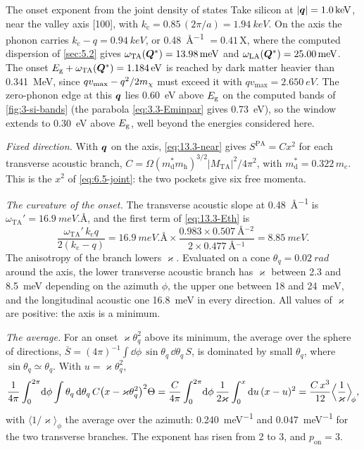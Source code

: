 \begin{workedexample}{The onset exponent from the joint density of states}\label{we:13-onset-exp}
Take silicon at $|\bm{q}| = \SI{1.0}{keV}$, near the valley axis [100], with $k_{\mathrm{c}} = 0.85\,(2\pi/a) = \SI{1.94}{keV}$. On the axis the phonon carries $k_{\mathrm{c}} - q = \SI{0.94}{keV}$, or \SI{0.48}{\angstrom^{-1}} $= 0.41\,\mathrm{X}$, where the computed dispersion of \cref{sec:5.2} gives $\omega_{\mathrm{TA}}(\bm{Q}^*) = \SI{13.98}{meV}$ and $\omega_{\mathrm{LA}}(\bm{Q}^*) = \SI{25.00}{meV}$. The onset $E_{\mathrm{g}} + \omega_{\mathrm{TA}}(\bm{Q}^*) = \SI{1.184}{eV}$ is reached by dark matter heavier than \SI{0.341}{MeV}, since $qv_{\mathrm{max}} - q^2/2m_{\chi}$ must exceed it with $qv_{\mathrm{max}} = \SI{2.650}{eV}$. The zero-phonon edge at this $\bm{q}$ lies \SI{0.60}{eV} above $E_{\mathrm{g}}$ on the computed bands of \cref{fig:3-si-bands} (the parabola \cref{eq:3.3-Eminpar} gives \SI{0.73}{eV}), so the window extends to \SI{0.30}{eV} above $E_{\mathrm{g}}$, well beyond the energies considered here.

\emph{Fixed direction.} With $\bm{q}$ on the axis, \cref{eq:13.3-near} gives $S^{\mathrm{PA}} = Cx^2$ for each transverse acoustic branch, $C = \Omega(m^*_{\mathrm{d}}m_{\mathrm{h}})^{3/2}|M_{\mathrm{TA}}|^2/4\pi^2$, with $m^*_{\mathrm{d}} = 0.322\,m_e$. This is the $x^2$ of \cref{eq:6.5-joint}: the two pockets give six free momenta.

\emph{The curvature of the onset.} The transverse acoustic slope at \SI{0.48}{\angstrom^{-1}} is $\omega_{\mathrm{TA}}' = \SI{16.9}{meV.\angstrom}$, and the first term of \cref{eq:13.3-Eth} is
\begin{equation*}
  \frac{\omega_{\mathrm{TA}}'\,k_{\mathrm{c}}q}{2(k_{\mathrm{c}} - q)} = \SI{16.9}{meV.\angstrom}\times\frac{0.983\times\SI{0.507}{\angstrom^{-2}}}{2\times\SI{0.477}{\angstrom^{-1}}} = \SI{8.85}{meV} .
\end{equation*}
The anisotropy of the branch lowers $\varkappa$. Evaluated on a cone $\theta_q = \SI{0.02}{rad}$ around the axis, the lower transverse acoustic branch has $\varkappa$ between 2.3 and \SI{8.5}{meV} depending on the azimuth $\phi$, the upper one between 18 and \SI{24}{meV}, and the longitudinal acoustic one \SI{16.8}{meV} in every direction. All values of $\varkappa$ are positive: the axis is a minimum.

\emph{The average.} For an onset $\varkappa\theta_q^2$ above its minimum, the average over the sphere of directions, $\bar S = (4\pi)^{-1}\int\dd\phi\,\sin\theta_q\,\dd\theta_q\,S$, is dominated by small $\theta_q$, where $\sin\theta_q \simeq \theta_q$. With $u = \varkappa\theta_q^2$,
\begin{equation*}
  \frac{1}{4\pi}\int_0^{2\pi}\!\mathrm{d}\phi\int\theta_q\,\mathrm{d}\theta_q\,C\bigl(x - \varkappa\theta_q^2\bigr)^2\Theta = \frac{C}{4\pi}\int_0^{2\pi}\!\mathrm{d}\phi\,\frac{1}{2\varkappa}\int_0^x\mathrm{d} u\,(x - u)^2 = \frac{C\,x^3}{12}\Bigl\langle\frac{1}{\varkappa}\Bigr\rangle_{\!\phi} ,
\end{equation*}
with $\langle 1/\varkappa\rangle_\phi$ the average over the azimuth: \SI{0.240}{meV^{-1}} and \SI{0.047}{meV^{-1}} for the two transverse branches. The exponent has risen from 2 to 3, and $p_{\mathrm{on}} = 3$.


\end{workedexample}
